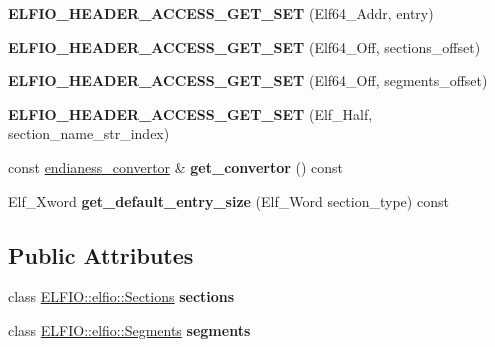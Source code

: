 \begin{DoxyCompactItemize}
\item 
{\bfseries E\+L\+F\+I\+O\+\_\+\+H\+E\+A\+D\+E\+R\+\_\+\+A\+C\+C\+E\+S\+S\+\_\+\+G\+E\+T\+\_\+\+S\+ET} (Elf64\+\_\+\+Addr, entry)\hypertarget{class_e_l_f_i_o_1_1elfio_a2d7c2d21ce1f1ee5594223a5e9c0ec0c}{}\label{class_e_l_f_i_o_1_1elfio_a2d7c2d21ce1f1ee5594223a5e9c0ec0c}

\item 
{\bfseries E\+L\+F\+I\+O\+\_\+\+H\+E\+A\+D\+E\+R\+\_\+\+A\+C\+C\+E\+S\+S\+\_\+\+G\+E\+T\+\_\+\+S\+ET} (Elf64\+\_\+\+Off, sections\+\_\+offset)\hypertarget{class_e_l_f_i_o_1_1elfio_a8c5153e5b46bb52de27e6a2a9ec54284}{}\label{class_e_l_f_i_o_1_1elfio_a8c5153e5b46bb52de27e6a2a9ec54284}

\item 
{\bfseries E\+L\+F\+I\+O\+\_\+\+H\+E\+A\+D\+E\+R\+\_\+\+A\+C\+C\+E\+S\+S\+\_\+\+G\+E\+T\+\_\+\+S\+ET} (Elf64\+\_\+\+Off, segments\+\_\+offset)\hypertarget{class_e_l_f_i_o_1_1elfio_aeab9eea10af4a4bac5c286ec910fc7d9}{}\label{class_e_l_f_i_o_1_1elfio_aeab9eea10af4a4bac5c286ec910fc7d9}

\item 
{\bfseries E\+L\+F\+I\+O\+\_\+\+H\+E\+A\+D\+E\+R\+\_\+\+A\+C\+C\+E\+S\+S\+\_\+\+G\+E\+T\+\_\+\+S\+ET} (Elf\+\_\+\+Half, section\+\_\+name\+\_\+str\+\_\+index)\hypertarget{class_e_l_f_i_o_1_1elfio_a568fa997e6ebce920adfdf1e3d31e96f}{}\label{class_e_l_f_i_o_1_1elfio_a568fa997e6ebce920adfdf1e3d31e96f}

\item 
const \hyperlink{class_e_l_f_i_o_1_1endianess__convertor}{endianess\+\_\+convertor} \& {\bfseries get\+\_\+convertor} () const \hypertarget{class_e_l_f_i_o_1_1elfio_af8a6706052d3029c76e5332eba10ad77}{}\label{class_e_l_f_i_o_1_1elfio_af8a6706052d3029c76e5332eba10ad77}

\item 
Elf\+\_\+\+Xword {\bfseries get\+\_\+default\+\_\+entry\+\_\+size} (Elf\+\_\+\+Word section\+\_\+type) const \hypertarget{class_e_l_f_i_o_1_1elfio_a465f3d0018c582c1a159a7ec6d0e4475}{}\label{class_e_l_f_i_o_1_1elfio_a465f3d0018c582c1a159a7ec6d0e4475}

\end{DoxyCompactItemize}
\subsection*{Public Attributes}
\begin{DoxyCompactItemize}
\item 
class \hyperlink{class_e_l_f_i_o_1_1elfio_1_1_sections}{E\+L\+F\+I\+O\+::elfio\+::\+Sections} {\bfseries sections}\hypertarget{class_e_l_f_i_o_1_1elfio_ac3304298a71603a89af5676c6bbce9de}{}\label{class_e_l_f_i_o_1_1elfio_ac3304298a71603a89af5676c6bbce9de}

\item 
class \hyperlink{class_e_l_f_i_o_1_1elfio_1_1_segments}{E\+L\+F\+I\+O\+::elfio\+::\+Segments} {\bfseries segments}\hypertarget{class_e_l_f_i_o_1_1elfio_acf8b907708e708153b95008eaa89c7be}{}\label{class_e_l_f_i_o_1_1elfio_acf8b907708e708153b95008eaa89c7be}

\end{DoxyCompactItemize}
